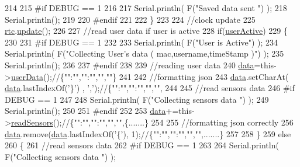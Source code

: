 \begin{DoxyCode}
214     
215 \textcolor{preprocessor}{    #if DEBUG == 1}
216 
217         Serial.println( F(\textcolor{stringliteral}{"Saved data sent "}) );
218         Serial.println();
219     
220 \textcolor{preprocessor}{    #endif}
221 
222     \}
223 
224     \textcolor{comment}{//clock update}
225     \hyperlink{classCoolBoard_a50d2a6716879d64a85f3c6b44ad63275}{rtc}.\hyperlink{classCoolTime_aae601f795452cfa48d9fb337aed483a8}{update}();
226 
227     \textcolor{comment}{//read user data if user is active}
228     \textcolor{keywordflow}{if}(\hyperlink{classCoolBoard_a6395459131d6889a3005f79c7a35e964}{userActive})
229     \{
230     
231 \textcolor{preprocessor}{    #if DEBUG == 1}
232 
233         Serial.println( F(\textcolor{stringliteral}{"User is Active"}) );
234         Serial.println( F(\textcolor{stringliteral}{"Collecting User's data ( mac,username,timeStamp )"}) );
235         Serial.println();
236     
237 \textcolor{preprocessor}{    #endif  }
238     
239         \textcolor{comment}{//reading user data}
240         \hyperlink{classCoolBoard_a427fb753dd8575bdf821c70a5c63d695}{data}=this->\hyperlink{classCoolBoard_ae7358fb6e623cfc81b775f5f1734909b}{userData}();\textcolor{comment}{//\{"":"","":"","",""\}}
241 
242         \textcolor{comment}{//formatting json }
243         \hyperlink{classCoolBoard_a427fb753dd8575bdf821c70a5c63d695}{data}.setCharAt( \hyperlink{classCoolBoard_a427fb753dd8575bdf821c70a5c63d695}{data}.lastIndexOf(\textcolor{charliteral}{'\}'}) , \textcolor{charliteral}{','});\textcolor{comment}{//\{"":"","":"","","",}
244                 
245         \textcolor{comment}{//read sensors data}
246 \textcolor{preprocessor}{    #if DEBUG == 1}
247 
248         Serial.println( F(\textcolor{stringliteral}{"Collecting sensors data "}) );
249         Serial.println();
250     
251 \textcolor{preprocessor}{    #endif}
252 
253         \hyperlink{classCoolBoard_a427fb753dd8575bdf821c70a5c63d695}{data}+=this->\hyperlink{classCoolBoard_ad03abdce2e65f520bbf2cff0f2d083cf}{readSensors}();\textcolor{comment}{//\{"":"","":"","","",\{.......\}     }
254 
255         \textcolor{comment}{//formatting json correctly}
256         \hyperlink{classCoolBoard_a427fb753dd8575bdf821c70a5c63d695}{data}.remove(\hyperlink{classCoolBoard_a427fb753dd8575bdf821c70a5c63d695}{data}.lastIndexOf(\textcolor{charliteral}{'\{'}), 1);\textcolor{comment}{//\{"":"","":"","","",.......\}}
257                 
258     \}   
259     \textcolor{keywordflow}{else}
260     \{
261         \textcolor{comment}{//read sensors data}
262 \textcolor{preprocessor}{    #if DEBUG == 1}
263 
264         Serial.println( F(\textcolor{stringliteral}{"Collecting sensors data "}) );

\end{DoxyCode}
